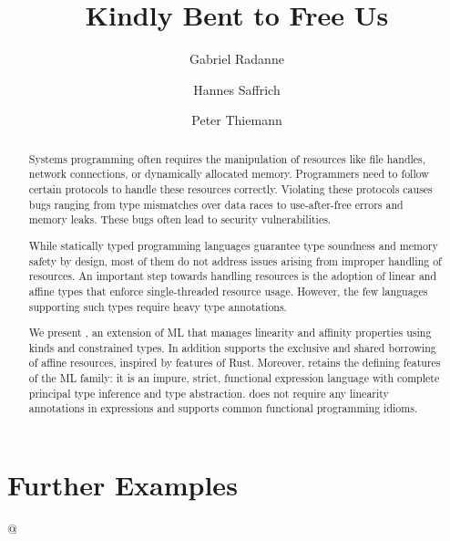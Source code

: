 \documentclass[acmsmall,review,anonymous]{acmart}
\author{Gabriel Radanne}
\affiliation{
  \institution{University of Freiburg}
  \country{Germany}
}
\author{Hannes Saffrich}
\affiliation{
  \institution{University of Freiburg}
  \country{Germany}
}
\author{Peter Thiemann}
\affiliation{
  \institution{University of Freiburg}
  \country{Germany}
}
\begin{document}
\title{Kindly Bent to Free Us}
\begin{abstract}
  Systems programming often requires the manipulation of resources like
  file handles, network connections, or dynamically allocated
  memory. Programmers need to follow certain protocols to handle
  these resources correctly. Violating these protocols causes bugs
  ranging from type mismatches over data races to use-after-free
  errors and memory leaks. These bugs often lead to security  vulnerabilities.

  While statically typed programming languages guarantee type soundness and memory
  safety by design, most of them do not address issues arising
  from improper handling of resources.
  An important step towards handling resources is the adoption of 
  linear and affine types that enforce single-threaded resource usage.
  However, the few languages supporting such types require heavy type
  annotations. 

  We present \lang, an extension of ML that
  manages linearity and affinity properties using kinds and
  constrained types. In addition
  \lang{} supports the exclusive and shared borrowing of affine
  resources, inspired by features of Rust.
  Moreover, \lang{} retains the defining features of the ML family:
  it is an impure, strict, functional expression language with complete principal type
  inference and type abstraction.
  \lang{} does not require any linearity annotations in
  expressions and supports common functional programming idioms.
\end{abstract}


\maketitle














\clearpage
\appendix

\section{Further Examples}
\label{sec:extra-example}
\lstMakeShortInline[keepspaces,basicstyle=\small\ttfamily]@


\lstDeleteShortInline@


\clearpage

\clearpage


\end{document}
